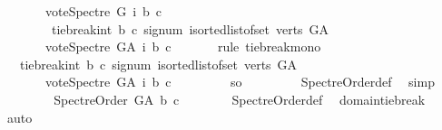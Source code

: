 \begin{isabellebody}
\ \ \ \ \ \ \ vote{\isacharunderscore}{\kern0pt}Spectre\ G\ i\ b\ c{\isacharparenright}{\kern0pt}{\isacharparenright}{\kern0pt}\ \isanewline
\ \ \ \ \ \ \ {\isasymle}\ tie{\isacharunderscore}{\kern0pt}break{\isacharunderscore}{\kern0pt}int\ b\ c\ {\isacharparenleft}{\kern0pt}signum\ {\isacharparenleft}{\kern0pt}{\isasymSum}i{\isasymleftarrow}sorted{\isacharunderscore}{\kern0pt}list{\isacharunderscore}{\kern0pt}of{\isacharunderscore}{\kern0pt}set\ {\isacharparenleft}{\kern0pt}verts\ G{\isacharunderscore}{\kern0pt}A{\isacharparenright}{\kern0pt}{\isachardot}{\kern0pt}\isanewline
\ \ \ \ \ \ \ vote{\isacharunderscore}{\kern0pt}Spectre\ G{\isacharunderscore}{\kern0pt}A\ i\ b\ c{\isacharparenright}{\kern0pt}{\isacharparenright}{\kern0pt}{\isachardoublequoteclose}\isanewline
\ \ \ \ \ \ \isamarkupfalse%
{\isacharparenleft}{\kern0pt}rule\ tie{\isacharunderscore}{\kern0pt}break{\isacharunderscore}{\kern0pt}mono{\isacharparenright}{\kern0pt}\isanewline
\ \ \ \ \isamarkupfalse%
\ \isamarkupfalse%
\ {\isachardoublequoteopen}{}\ {\isasymle}\ tie{\isacharunderscore}{\kern0pt}break{\isacharunderscore}{\kern0pt}int\ b\ c\ {\isacharparenleft}{\kern0pt}signum\ {\isacharparenleft}{\kern0pt}{\isasymSum}i{\isasymleftarrow}sorted{\isacharunderscore}{\kern0pt}list{\isacharunderscore}{\kern0pt}of{\isacharunderscore}{\kern0pt}set\ {\isacharparenleft}{\kern0pt}verts\ G{\isacharunderscore}{\kern0pt}A{\isacharparenright}{\kern0pt}{\isachardot}{\kern0pt}\isanewline
\ \ \ \ \ \ \ vote{\isacharunderscore}{\kern0pt}Spectre\ G{\isacharunderscore}{\kern0pt}A\ i\ b\ c{\isacharparenright}{\kern0pt}{\isacharparenright}{\kern0pt}\ {\isachardoublequoteclose}\isanewline
\ \ \ \ \ \ \isamarkupfalse%
\ so\ \isanewline
\ \ \ \ \ \ \isamarkupfalse%
\ Spectre{\isacharunderscore}{\kern0pt}Order{\isacharunderscore}{\kern0pt}def\ \isamarkupfalse%
\ simp\isanewline
\ \ \ \ \isamarkupfalse%
\ \isamarkupfalse%
\ {\isachardoublequoteopen}\ Spectre{\isacharunderscore}{\kern0pt}Order\ G{\isacharunderscore}{\kern0pt}A\ b\ c{\isachardoublequoteclose}\isanewline
\ \ \ \ \ \ \isamarkupfalse%
\ Spectre{\isacharunderscore}{\kern0pt}Order{\isacharunderscore}{\kern0pt}def\ \isamarkupfalse%
\ domain{\isacharunderscore}{\kern0pt}tie{\isacharunderscore}{\kern0pt}break\ \isamarkupfalse%
\ auto\isanewline
\ \ \isamarkupfalse%
\isanewline
{}\isamarkupfalse%
%
\endisatagproof
{\isafoldproof}%

\end{isabellebody}
